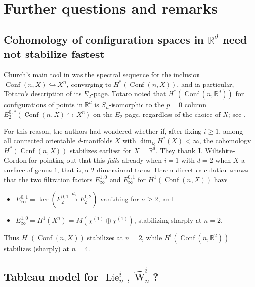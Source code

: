 \documentclass[12pt]{amsart}
\theoremstyle{plain}
\theoremstyle{definition}
\begin{document}
\section{Further questions and remarks}
\label{remark-section}

\subsection{Cohomology of configuration spaces 
in ${{\mathbb{R}}}^d$ need not stabilize fastest}
\label{fastest-stabilization-question}

Church's main tool in \cite{Church}
was the spectral sequence
for the inclusion ${{\operatorname{Conf}}}(n,X) \hookrightarrow X^n$, converging
to $H^*({{\operatorname{Conf}}}(n,X))$, and in particular,
Totaro's description \cite{Totaro} 
of its $E_2$-page.  Totaro noted
that $H^*({{\operatorname{Conf}}}(n,{{\mathbb{R}}}^d))$ for configurations of points in 
${{\mathbb{R}}}^d$ is $S_n$-isomorphic to the $p=0$ column 
$E_2^{0,*}\left({{\operatorname{Conf}}}(n,X) \hookrightarrow X^n \right)$ on the $E_2$-page, 
regardless of the choice of $X$;  see \cite[Lemma 1]{Totaro}. 

For this reason, the authors had wondered whether if,
after fixing $i \geq 1$,
among all connected orientable $d$-manifolds $X$ with 
$\dim_{{\mathbb Q}} H^*(X) < \infty$, the cohomology $H^*({{\operatorname{Conf}}}(n,X))$ 
stabilizes earliest for $X={{\mathbb{R}}}^d$.  
They thank J. Wiltshire-Gordon for pointing out that this {\it fails}
already when $i=1$ with $d=2$ when $X$ a surface of genus $1$, that is,
a $2$-dimensional torus.  Here a direct calculation shows that
the two filtration factors $E_\infty^{1,0}$ and $E_\infty^{0,1}$ for
$H^1({{\operatorname{Conf}}}(n,X))$ have
\begin{itemize}
\item 
$
E_\infty^{0,1}=\ker\left(E_2^{0,1} \overset{d_2}{\rightarrow} E_2^{1,2} \right)
$
vanishing for $n \geq 2$, and
\item 
$E_\infty^{1,0}=H^1(X^n)=M(\chi^{(1)}\oplus\chi^{(1)})$, stabilizing sharply at $n=2$.
\end{itemize}
Thus $H^1({{\operatorname{Conf}}}(n,X))$
stabilizes at $n=2$, while $H^1({{\operatorname{Conf}}}(n,{{\mathbb{R}}}^2))$
stabilizes (sharply) at $n=4$.

\subsection{Tableau model for 
${{\operatorname{Lie}}}^i_n, \widehat{{\operatorname{W}}}^i_n$?}
\end{document}

